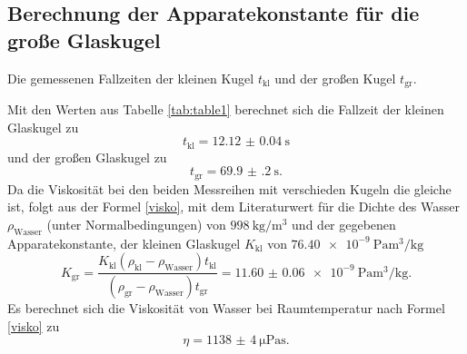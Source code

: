 \subsection{Berechnung der Apparatekonstante für die große Glaskugel}
\begin{table}
	\centering
	\caption{Die gemessenen Fallzeiten der kleinen Kugel $t_\text{kl}$ und der großen Kugel $t_\text{gr}$.}
	
\end{table}
Mit den Werten aus Tabelle \ref{tab:table1} berechnet sich die Fallzeit der kleinen Glaskugel zu
\begin{displaymath}
	t_\text{kl} = \SI{12.12(4)}{\second}
\end{displaymath}
und der großen Glaskugel zu
\begin{displaymath}
	t_\text{gr} = \SI{69.9(2)}{\second}\text{.}
\end{displaymath}
Da die Viskosität bei den beiden Messreihen mit verschieden Kugeln die gleiche ist, folgt aus der Formel \eqref{visko}, mit dem Literaturwert für die Dichte des Wasser $\rho_\text{Wasser}$ (unter Normalbedingungen) von $\SI{998}{\kilo\gram\per\meter\tothe{3}}$ \cite{eta} und der gegebenen Apparatekonstante, der kleinen Glaskugel $K_\text{kl}$ von $\SI{76.40e-9}{\pascal\meter\tothe{3}\per\kilo\gram}$
\begin{displaymath}
	K_\text{gr} = \frac{K_\text{kl} \left( \rho_\text{kl} - \rho_\text{Wasser}\right) t_\text{kl}}{\left( \rho_\text{gr} - \rho_\text{Wasser}\right) t_\text{gr}} = \SI{11.60(6)e-9}{\pascal\meter\tothe{3}\per\kilo\gram}\text{.}
\end{displaymath}
Es berechnet sich die Viskosität von Wasser bei Raumtemperatur nach Formel \eqref{visko} zu
\begin{displaymath}
	\eta = \SI{1138(4)}{\micro\pascal\second}\text{.}
\end{displaymath}


